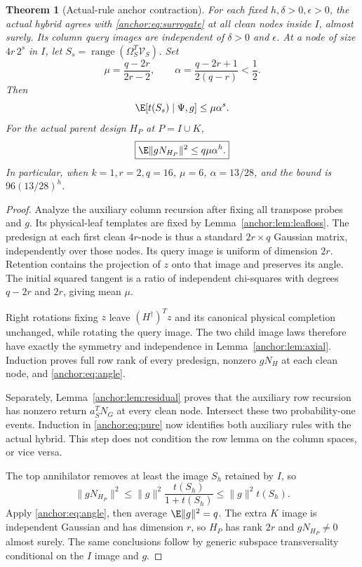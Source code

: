 \documentclass[11pt,oneside,openany,a4paper]{book}
\numberwithin{equation}{chapter}
\newtheorem{theorem}{Theorem}[chapter]
\theoremstyle{definition}
\theoremstyle{remark}
\DeclareMathOperator{\ran}{range}\DeclareMathOperator{\OPT}{OPT}
\begin{document}
\begin{theorem}[Actual-rule anchor contraction]\label{anchor:thm:anchor}
For each fixed $h,\delta>0,\epsilon>0$, the actual hybrid agrees with \eqref{anchor:eq:surrogate} at all clean nodes inside $I$, almost surely. Its column query images are independent of $\delta>0$ and $\epsilon$. At a node of size $4r\,2^s$ in $I$, let
$S_s=\ran(\Omega_S^T\mathcal V_S)$. Set
\begin{equation}\label{anchor:eq:constants}
 \mu=\frac{q-2r}{2r-2},\qquad
 \alpha=\frac{q-2r+1}{2(q-r)}<\frac12.
\end{equation}
Then
\begin{equation}\label{anchor:eq:angle}
 \E[t(S_s)\mid\Psi,g]\le\mu\alpha^s.
\end{equation}
For the actual parent design $H_P$ at $P=I\cup K$,
\begin{equation}\label{anchor:eq:anchor-energy}
 \boxed{\E\|gN_{H_P}\|^2\le q\mu\alpha^h.}
\end{equation}
In particular, when $k=1,r=2,q=16$, $\mu=6$, $\alpha=13/28$, and the bound is $96(13/28)^h$.
\end{theorem}
\begin{proof}
Analyze the auxiliary column recursion after fixing all transpose probes and $g$. Its physical-leaf templates are fixed by Lemma~\ref{anchor:lem:leafloss}. The predesign at each first clean $4r$-node is thus a standard $2r\times q$ Gaussian matrix, independently over those nodes. Its query image is uniform of dimension $2r$. Retention contains the projection of $z$ onto that image and preserves its angle. The initial squared tangent is a ratio of independent chi-squares with degrees $q-2r$ and $2r$, giving mean $\mu$.

Right rotations fixing $z$ leave $(H^\dagger)^Tz$ and its canonical physical completion unchanged, while rotating the query image. The two child image laws therefore have exactly the symmetry and independence in Lemma~\ref{anchor:lem:axial}. Induction proves full row rank of every predesign, nonzero $gN_H$ at each clean node, and \eqref{anchor:eq:angle}.

Separately, Lemma~\ref{anchor:lem:residual} proves that the auxiliary row recursion has nonzero return $a_S^TN_G$ at every clean node. Intersect these two probability-one events. Induction in \eqref{anchor:eq:pure} now identifies both auxiliary rules with the actual hybrid. This step does not condition the row lemma on the column spaces, or vice versa.

The top annihilator removes at least the image $S_h$ retained by $I$, so
\[
 \|gN_{H_P}\|^2\le\|g\|^2\frac{t(S_h)}{1+t(S_h)}
                        \le\|g\|^2t(S_h).
\]
Apply \eqref{anchor:eq:angle}, then average $\E\|g\|^2=q$. The extra $K$ image is independent Gaussian and has dimension $r$, so $H_P$ has rank $2r$ and $gN_{H_P}\ne0$ almost surely. The same conclusions follow by generic subspace transversality conditional on the $I$ image and $g$.
\end{proof}
\end{document}
